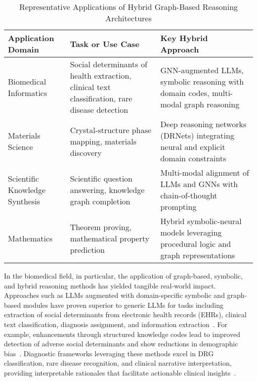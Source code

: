 \begin{table*}[htbp]
\centering
\caption{Representative Applications of Hybrid Graph-Based Reasoning Architectures}
\label{tab:domain_applications}
\begin{adjustbox}{max width=\textwidth}
\begin{tabular}{lll}
\toprule
\textbf{Application Domain} & \textbf{Task or Use Case} & \textbf{Key Hybrid Approach} \\
\midrule
Biomedical Informatics & Social determinants of health extraction, clinical text classification, rare disease detection & GNN-augmented LLMs, symbolic reasoning with domain codes, multi-modal graph reasoning \\
Materials Science & Crystal-structure phase mapping, materials discovery & Deep reasoning networks (DRNets) integrating neural and explicit domain constraints \\
Scientific Knowledge Synthesis & Scientific question answering, knowledge graph completion & Multi-modal alignment of LLMs and GNNs with chain-of-thought prompting \\
Mathematics & Theorem proving, mathematical property prediction & Hybrid symbolic-neural models leveraging procedural logic and graph representations \\
\bottomrule
\end{tabular}
\end{adjustbox}
\end{table*}

In the biomedical field, in particular, the application of graph-based, symbolic, and hybrid reasoning methods has yielded tangible real-world impact. Approaches such as LLMs augmented with domain-specific symbolic and graph-based modules have proven superior to generic LLMs for tasks including extraction of social determinants from electronic health records (EHRs), clinical text classification, diagnosis assignment, and information extraction~\cite{ref1,ref2,ref3,ref4,ref5,ref15,ref18,ref19,ref36,ref43,ref45,ref47,ref49,ref50,ref53,ref55,ref61,ref62,ref89,ref94,ref95}. For example, enhancements through structured knowledge codes lead to improved detection of adverse social determinants and show reductions in demographic bias~\cite{ref1,ref2,ref53,ref61}. Diagnostic frameworks leveraging these methods excel in DRG classification, rare disease recognition, and clinical narrative interpretation, providing interpretable rationales that facilitate actionable clinical insights~\cite{ref4,ref5,ref36,ref43,ref45,ref47,ref50,ref53,ref62,ref94,ref95}.


